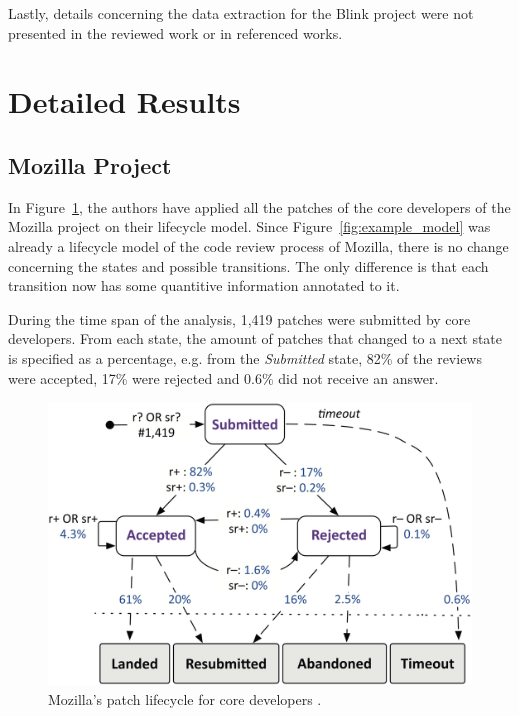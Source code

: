 \documentclass[conference]{IEEEtran}
\begin{document}
Lastly, details concerning the data extraction for the Blink project were not presented in the reviewed work or in referenced works.

\section{Detailed Results}

\subsection{Mozilla Project}

In Figure~\ref{fig:mozilla_core_dev}, the authors have applied all the patches of the core developers of the Mozilla project on their lifecycle model. Since Figure~\ref{fig:example_model} was already a lifecycle model of the code review process of Mozilla, there is no change concerning the states and possible transitions. The only difference is that each transition now has some quantitive information annotated to it.

During the time span of the analysis, 1,419 patches were submitted by core developers. From each state, the amount of patches that changed to a next state is specified as a percentage, e.g. from the \textit{Submitted} state, 82\% of the reviews were accepted, 17\% were rejected and 0.6\% did not receive an answer.

\pagebreak

\begin{figure}
    \centering
    \includegraphics[scale=0.23]{img/mozilla_core_developers.png}
    \caption{Mozilla's patch lifecycle for core developers \cite{baysal2015synthesizing}.}
    \label{fig:mozilla_core_dev}
\end{figure}
\end{document}
